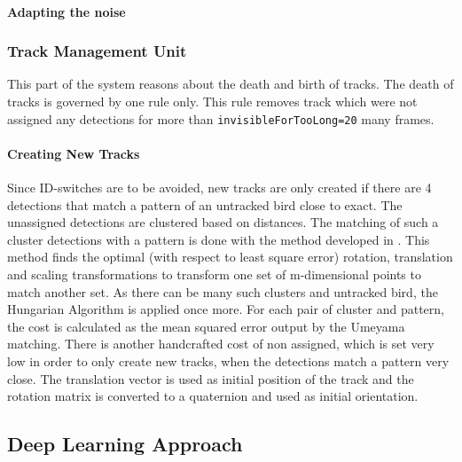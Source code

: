 \documentclass{article}
\begin{document}
\paragraph{Adapting the noise} %

\subsubsection{Track Management Unit}
This part of the system reasons about the death and birth of tracks. %
The death of tracks is governed by one rule  only. This rule removes track which were not assigned any detections for more than \texttt{invisibleForTooLong=20} many frames.

\paragraph{Creating New Tracks}  %
Since ID-switches are to be avoided, new tracks are only created if there are 4 detections that match a pattern of an untracked bird close to exact. The unassigned detections are clustered based on distances. The matching of such a cluster detections with a pattern is done with the method developed in \cite{umeyama}. This method finds the optimal (with respect to least square error) rotation, translation and scaling transformations to transform one set of m-dimensional points to match another set. As there can be many such clusters and untracked bird, the Hungarian Algorithm is applied once more. For each pair of cluster and pattern, the cost is calculated as the mean squared error output by the Umeyama matching. There is another handcrafted cost of non assigned, which is set very low in order to only create new tracks, when the detections match a pattern very close. The translation vector is used as initial position of the track and the rotation matrix is converted to a quaternion and used as initial orientation.




\subsection{Deep Learning Approach}
\label{dl_approach}
\end{document}
